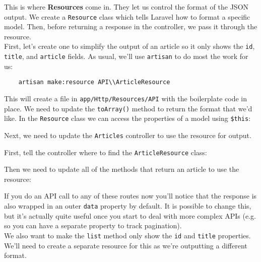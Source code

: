 This is where \textbf{Resources} come in. They let us control the format of the JSON output. We create a \texttt{Resource} class which tells Laravel how to format a specific model. Then, before returning a response in the controller, we pass it through the resource.
\\

First, let's create one to simplify the output of an article so it only shows the \texttt{id}, \texttt{title}, and \texttt{article} fields. As usual, we'll use \texttt{artisan} to do most the work for us:

\begin{verbatim}
    artisan make:resource API\\ArticleResource
\end{verbatim}

This will create a file in \texttt{app/Http/Resources/API} with the boilerplate code in place. We need to update the \texttt{toArray()} method to return the format that we'd like. In the \texttt{Resource} class we can access the properties of a model using \texttt{\$this}:


Next, we need to update the \texttt{Articles} controller to use the resource for output.

First, tell the controller where to find the \texttt{ArticleResource} class:


Then we need to update all of the methods that return an article to use the resource:


If you do an API call to any of these routes now you'll notice that the response is also wrapped in an outer \texttt{data} property by default. It is possible to change this, but it's actually quite useful once you start to deal with more complex APIs (e.g. so you can have a separate property to track pagination).
\\

We also want to make the \texttt{list} method only show the \texttt{id} and \texttt{title} properties. We'll need to create a separate resource for this as we're outputting a different format.
\\

